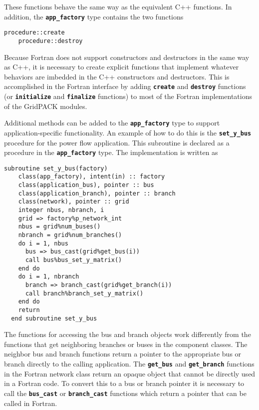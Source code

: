 These functions behave the same way as the equivalent C++ functions. In addition, the \texttt{\textbf{app\_factory}} type contains the two functions

{
\color{red}
\begin{Verbatim}[fontseries=b]
    procedure::create
    procedure::destroy
\end{Verbatim}
}

Because Fortran does not support constructors and destructors in the same way as C++, it is necessary to create explicit functions that implement whatever behaviors are imbedded in the C++ constructors and destructors. This is accomplished in the Fortran interface by adding \texttt{\textbf{create}} and \texttt{\textbf{destroy}} functions (or \texttt{\textbf{initialize}} and \texttt{\textbf{finalize}} functions) to most of the Fortran implementations of the GridPACK modules.

Additional methods can be added to the \texttt{\textbf{app\_factory}} type to support application-specific functionality. An example of how to do this is the \texttt{\textbf{set\_y\_bus}} procedure for the power flow application. This subroutine is declared as a procedure in the \texttt{\textbf{app\_factory}} type. The implementation is written as

{
\color{red}
\begin{Verbatim}[fontseries=b]
  subroutine set_y_bus(factory)
    class(app_factory), intent(in) :: factory
    class(application_bus), pointer :: bus
    class(application_branch), pointer :: branch
    class(network), pointer :: grid
    integer nbus, nbranch, i
    grid => factory%p_network_int
    nbus = grid%num_buses()
    nbranch = grid%num_branches()
    do i = 1, nbus
      bus => bus_cast(grid%get_bus(i))
      call bus%bus_set_y_matrix()
    end do
    do i = 1, nbranch
      branch => branch_cast(grid%get_branch(i))
      call branch%branch_set_y_matrix()
    end do
    return
  end subroutine set_y_bus
\end{Verbatim}
}

The functions for accessing the bus and branch objects work differently from the functions that get neighboring branches or buses in the component classes. The neighbor bus and branch functions return a pointer to the appropriate bus or branch directly to the calling application. The \texttt{\textbf{get\_bus}} and \texttt{\textbf{get\_branch}} functions in the Fortran network class return an opaque object that cannot be directly used in a Fortran code. To convert this to  a bus or branch pointer it is necessary to call the \texttt{\textbf{bus\_cast}} or \texttt{\textbf{branch\_cast}} functions which return a pointer that can be called in Fortran.

